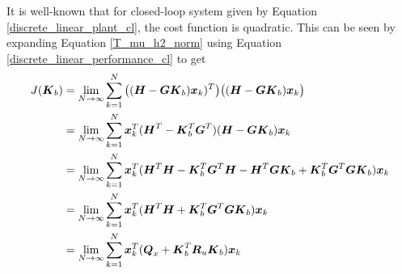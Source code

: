 It is well-known that for closed-loop system given by Equation \eqref{discrete_linear_plant_cl}, the cost function is quadratic.  This can be seen by expanding Equation \eqref{T_mu_h2_norm} using Equation \eqref{discrete_linear_performance_cl} to get
\begin{equation}
\label{J_K_h2_cost}
\begin{aligned}
	J(\vb*{K}_{b}) &= \lim_{N \to \infty} \sum_{k = 1}^{N} \big{(}(\vb*{H} - \vb*{G}\vb*{K}_{b})\vb*{x}_{k})^{T} \big{)}
		\big{(}(\vb*{H} - \vb*{G}\vb*{K}_{b})\vb*{x}_{k}\big{)}\\
	&= \lim_{N \to \infty} \sum_{k = 1}^{N} \vb*{x}_{k}^{T}(\vb*{H}^{T} - \vb*{K}_{b}^{T}\vb*{G}^{T})(\vb*{H} - \vb*{G}\vb*{K}_{b})\vb*{x}_{k}\\
	&= \lim_{N \to \infty} \sum_{k = 1}^{N} \vb*{x}_{k}^{T}(\vb*{H}^{T}\vb*{H}
		- \vb*{K}_{b}^{T}\vb*{G}^{T}\vb*{H} - \vb*{H}^{T}\vb*{G}\vb*{K}_{b}
		+ \vb*{K}_{b}^{T}\vb*{G}^{T}\vb*{G}\vb*{K}_{b})\vb*{x}_{k}\\
	&= \lim_{N \to \infty} \sum_{k = 1}^{N} \vb*{x}_{k}^{T}(\vb*{H}^{T}\vb*{H}
		+ \vb*{K}_{b}^{T}\vb*{G}^{T}\vb*{G}\vb*{K}_{b})\vb*{x}_{k}\\
	&= \lim_{N \to \infty} \sum_{k = 1}^{N} \vb*{x}_{k}^{T}(\vb*{Q}_{x}
		+ \vb*{K}_{b}^{T}\vb*{R}_{u}\vb*{K}_{b})\vb*{x}_{k}\\
\end{aligned}
\end{equation}

